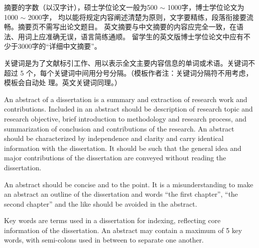 

\begin{cabstract}

摘要的字数（以汉字计），硕士学位论文一般为500 $\sim$ 1000字，博士学位论文为1000 $\sim$ 2000字，
均以能将规定内容阐述清楚为原则，文字要精练，段落衔接要流畅。摘要页不需写出论文题目。
英文摘要与中文摘要的内容应完全一致，在语法、用词上应准确无误，语言简练通顺。
留学生的英文版博士学位论文中应有不少于3000字的“详细中文摘要”。

  关键词是为了文献标引工作、用以表示全文主要内容信息的单词或术语。关键词不超过 5
  个，每个关键词中间用分号分隔。（模板作者注：关键词分隔符不用考虑，模板会自动处
  理。英文关键词同理。）
\end{cabstract}

\begin{eabstract}
   An abstract of a dissertation is a summary and extraction of research work
   and contributions. Included in an abstract should be description of research
   topic and research objective, brief introduction to methodology and research
   process, and summarization of conclusion and contributions of the
   research. An abstract should be characterized by independence and clarity and
   carry identical information with the dissertation. It should be such that the
   general idea and major contributions of the dissertation are conveyed without
   reading the dissertation.

   An abstract should be concise and to the point. It is a misunderstanding to
   make an abstract an outline of the dissertation and words ``the first
   chapter'', ``the second chapter'' and the like should be avoided in the
   abstract.

   Key words are terms used in a dissertation for indexing, reflecting core
   information of the dissertation. An abstract may contain a maximum of 5 key
   words, with semi-colons used in between to separate one another.
\end{eabstract}
